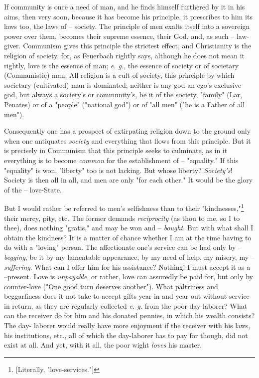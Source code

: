 \documentclass[a4paper]{book}
\begin{document}
If community is once a need of man, and he finds himself furthered by it in 
his aims, then very soon, because it has become his principle, it prescribes 
to him its laws too, the laws of -- society. The principle of men exalts 
itself into a sovereign power over them, becomes their supreme essence, their 
God, and, as such -- law-giver. Communism gives this principle the strictest 
effect, and Christianity is the religion of society, for, as Feuerbach rightly 
says, although he does not mean it rightly, love is the essence of man; 
\textit{e. g.}, the essence of society or of societary (Communistic) man. All 
religion is a cult of society, this principle by which societary (cultivated) 
man is dominated; neither is any god an ego's exclusive god, but always a 
society's or community's, be it of the society, "{}family"{} (Lar, Penates) or 
of a "{}people"{} ("{}national god"{}) or of "{}all men"{} ("{}he is a Father 
of all men"{}).

Consequently one has a prospect of extirpating religion down to the ground 
only when one antiquates \textit{society} and everything that flows from this 
principle. But it is precisely in Communism that this principle seeks to 
culminate, as in it everything is to become \textit{common} for the 
establishment of -- "{}equality."{} If this "{}equality"{} is won, 
"{}liberty"{} too is not lacking. But whose liberty? \textit{Society's}! 
Society is then all in all, and men are only "{}for each other."{} It would be 
the glory of the -- love-State.

But I would rather be referred to men's selfishness than to their 
"{}kindnesses,"{}\footnote{[Literally, "{}love-services."{}]} their mercy, 
pity, etc. The former demands \textit{reciprocity} (as thou to me, so I to 
thee), does nothing "{}gratis,"{} and may be won and -- \textit{bought}. But 
with what shall I obtain the kindness? It is a matter of chance whether I am 
at the time having to do with a "{}loving"{} person. The affectionate one's 
service can be had only by -- \textit{begging}, be it by my lamentable 
appearance, by my need of help, my misery, my -- \textit{suffering}. What can 
I offer him for his assistance? Nothing! I must accept it as a --present. Love 
is \textit{unpayable}, or rather, love can assuredly be paid for, but only by 
counter-love ("{}One good turn deserves another"{}). What paltriness and 
beggarliness does it not take to accept gifts year in and year out without 
service in return, as they are regularly collected \textit{e. g.} from the 
poor day-laborer? What can the receiver do for him and his donated pennies, in 
which his wealth consists? The day- laborer would really have more enjoyment 
if the receiver with his laws, his institutions, etc., all of which the 
day-laborer has to pay for though, did not exist at all. And yet, with it all, 
the poor wight \textit{loves} his master.
\end{document}
